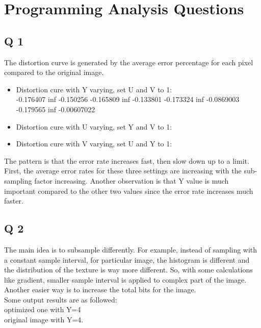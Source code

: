 \documentclass[10pt]{report}            %
\begin{document}
\chapter*{Programming Analysis Questions}
  \section*{Q 1}
  The distortion curve is generated by the average error percentage for each pixel compared to the original image.
  \begin{itemize}
  
  \item
  Distortion cure with Y varying, set U and V to 1:\\
  -0.176407  inf -0.150256
  -0.165809  inf -0.133801
  -0.173324  inf -0.0869003
  -0.179565  inf -0.00607022
  \item
  Distortion cure with U varying, set Y and V to 1:
  \item
  Distortion cure with V varying, set U and Y to 1:
\end{itemize}
	The pattern is that the error rate increases fast, then slow down up to a limit.\\
	First, the average error rates for these three settings are increasing with the sub-sampling factor increasing. Another observation is that Y value is much important compared to the other two values since the error rate increases much faster.\\
  \section*{Q 2}
     The main idea is to subsample differently. For example, instead of sampling with a constant sample interval, for particular image, the histogram is different and the distribution of the texture is  way more different. So, with some calculations like gradient, smaller sample interval is applied to complex part of the image.\\
     Another easier way is to increase the total bits for the image.\\
     Some output results are as followed:\\
     optimized one with Y=4\\
      original image with Y=4.
     \fi
\end{document}
